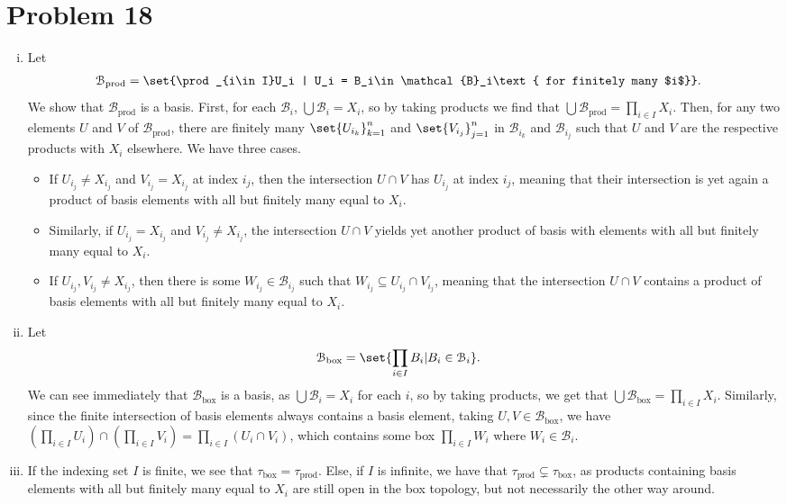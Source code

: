 \documentclass[10pt]{mypackage}
\begin{document}
\section{Problem 18}%
\begin{enumerate}[(i)]
  \item Let 
    \begin{align*}
      \mathcal{B}_{\text{prod}} &= \set{\prod_{i\in I}U_i | U_i = B_i\in \mathcal{B}_i\text{ for finitely many $i$}}.
    \end{align*}
    We show that $\mathcal{B}_{\text{prod}}$ is a basis. First, for each $\mathcal{B}_i$, $\bigcup \mathcal{B}_i = X_i$, so by taking products we find that $\bigcup \mathcal{B}_{\text{prod}} = \prod_{i\in I}X_i$. Then, for any two elements $U$ and $V$ of $\mathcal{B}_{\text{prod}}$, there are finitely many $\set{U_{i_k}}_{k=1}^{n}$ and $\set{V_{i_j}}_{j=1}^{n}$ in $\mathcal{B}_{i_k}$ and $\mathcal{B}_{i_j}$ such that $U$ and $V$ are the respective products with $X_i$ elsewhere. We have three cases.
    \begin{itemize}
      \item If $U_{i_j}\neq X_{i_j}$ and $V_{i_j} = X_{i_j}$ at index $i_j$, then the intersection $U\cap V$ has $U_{i_j}$ at index $i_j$, meaning that their intersection is yet again a product of basis elements with all but finitely many equal to $X_i$.
      \item Similarly, if $U_{i_j} = X_{i_j}$ and $V_{i_j}\neq X_{i_j}$, the intersection $U\cap V$ yields yet another product of basis with elements with all but finitely many equal to $X_i$.
      \item If $U_{i_j},V_{i_j}\neq X_{i_j}$, then there is some $W_{i_j}\in \mathcal{B}_{i_j}$ such that $W_{i_j}\subseteq U_{i_j}\cap V_{i_j}$, meaning that the intersection $U\cap V$ contains a product of basis elements with all but finitely many equal to $X_i$.
    \end{itemize}
  \item Let
    \begin{align*}
      \mathcal{B}_{\text{box}} &= \set{\prod_{i\in I} B_i | B_i\in \mathcal{B}_i}.
    \end{align*}
    We can see immediately that $\mathcal{B}_{\text{box}}$ is a basis, as $\bigcup \mathcal{B}_i = X_i$ for each $i$, so by taking products, we get that $\bigcup \mathcal{B}_{\text{box}} = \prod_{i\in I}X_i$. Similarly, since the finite intersection of basis elements always contains a basis element, taking $U,V\in \mathcal{B}_{\text{box}}$, we have $\left( \prod_{i\in I}U_i \right)\cap \left( \prod_{i\in I}V_i \right) = \prod_{i\in I}\left( U_i\cap V_i \right)$, which contains some box $\prod_{i\in I} W_i$ where $W_i\in \mathcal{B}_i$.
  \item If the indexing set $I$ is finite, we see that $\tau_{\text{box}} = \tau_{\text{prod}}$. Else, if $I$ is infinite, we have that $\tau_{\text{prod}}\subsetneq \tau_{\text{box}}$, as products containing basis elements with all but finitely many equal to $X_i$ are still open in the box topology, but not necessarily the other way around.
\end{enumerate}
\end{document}

